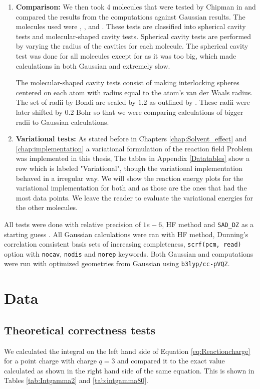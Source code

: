 \documentclass[../Thesis.tex]{subfiles}
\begin{document}
\begin{enumerate}
\item \textbf{Comparison:} We then took 4 molecules that were tested by Chipman in \cite{Chipman2002} and compared the
results from the computations against Gaussian results. The molecules used
were , ,  and . These tests are classified into
spherical cavity tests and molecular-shaped cavity tests. Spherical cavity tests are performed
by varying the radius of the cavities for each molecule. The spherical cavity test was done for
all molecules except for  as it was too big, which made calculations
in both Gaussian and \mrchem extremely slow.

The molecular-shaped cavity tests consist of making interlocking spheres centered on
each atom with radius equal to the atom's van der Waals radius. The set of radii by
 Bondi \cite{doi:10.1021/j100785a001} are scaled by $1.2$ as outlined by \cite{Tomasi:1994wt}.
 These radii were later shifted by $0.2$ Bohr so that we were comparing
 \mrchem calculations of bigger radii to Gaussian calculations.

\item \textbf{Variational tests:} As stated before in Chapters \ref{chap:Solvent_effect} and \ref{chap:implementation}
a variational formulation of the reaction field Problem was implemented in this thesis,
The tables in Appendix \ref{Datatables} show a row which is labeled "Variational",
though the variational implementation behaved in a irregular way. We will show
the reaction energy plots for the variational implementation for both 
and  as those are the ones that had the most data points. We leave the
reader to evaluate the variational energies for the other molecules.

\end{enumerate}
All \mrchem tests were done with relative precision of $1e-6$, HF method and \verb!SAD_DZ! as a
starting guess \cite{MRchem}. All Gaussian calculations were ran with \ac{HF} method,  Dunning's correlation
consistent basis sets\cite{doi:10.1063/1.456153} of increasing completeness, \verb!scrf(pcm, read)! option with
\verb!nocav!, \verb!nodis! and  \verb!norep! keywords. Both Gaussian and \mrchem computations were run with
optimized geometries from Gaussian using \verb!b3lyp/cc-pVQZ!.

\section{Data}
\subsection{Theoretical correctness tests}
We calculated the integral on the left hand side of Equation \ref{eq:Reactioncharge} for a point charge
with charge $q=3$ and compared it to the exact value calculated as shown in the right hand side of the same
equation. This is shown in Tables \ref{tab:Intgamma2} and \ref{tab:intgamma80}.
\end{document}
